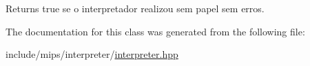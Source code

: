 \begin{DoxyReturn}{Returns}
true se o interpretador realizou sem papel sem erros. 
\end{DoxyReturn}


The documentation for this class was generated from the following file\+:\begin{DoxyCompactItemize}
\item 
include/mips/interpreter/\hyperlink{interpreter_8hpp}{interpreter.\+hpp}\end{DoxyCompactItemize}
